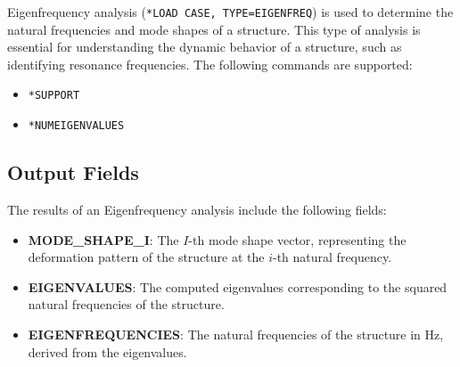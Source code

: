 Eigenfrequency analysis (\texttt{*LOAD CASE, TYPE=EIGENFREQ}) is used to determine the natural frequencies and
mode shapes of a structure. This type of analysis is essential for understanding the dynamic behavior of a structure,
such as identifying resonance frequencies. The following commands are supported:

\begin{itemize}
    \item \texttt{*SUPPORT}
    \item \texttt{*NUMEIGENVALUES}
\end{itemize}

\subsection{Output Fields}
The results of an Eigenfrequency analysis include the following fields:

\begin{itemize}
    \item \textbf{MODE\_SHAPE\_I}: The $I$-th mode shape vector, representing the deformation pattern of the structure at the $i$-th natural frequency.
    \item \textbf{EIGENVALUES}: The computed eigenvalues corresponding to the squared natural frequencies of the structure.
    \item \textbf{EIGENFREQUENCIES}: The natural frequencies of the structure in Hz, derived from the eigenvalues.
\end{itemize}

\newpage

